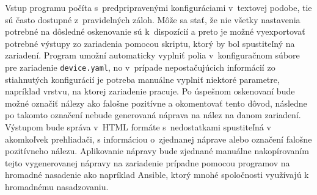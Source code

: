 Vstup programu počíta s~predpripravenými konfiguráciami v~textovej podobe, tie sú často dostupné z~pravidelných záloh. Môže sa stať, že nie všetky nastavenia potrebné na dôsledné oskenovanie sú k~dispozícií a preto je možné vyexportovať potrebné výstupy zo zariadenia pomocou skriptu, ktorý by bol spustiteľný na zariadení. Program umožní automaticky vyplniť polia v~konfiguračnom súbore pre zariadenie \texttt{device.yaml}, no v~prípade nepostačujúcich informácií zo stiahnutých konfigurácií je potreba manuálne vyplniť niektoré parametre, napríklad vrstvu, na ktorej zariadenie pracuje. Po úspešnom oskenovaní bude možné označiť nálezy ako falošne pozitívne a okomentovať tento dôvod, následne po takomto označení nebude generovaná náprava na nález na danom zariadení. Výstupom bude správa v~HTML formáte s~nedostatkami spustiteľná v akomkoľvek prehliadači, s informáciou o~zjednanej náprave alebo označení falošne pozitívneho nálezu. Aplikovanie nápravy bude zjednané manuálne nakopírovaním tejto vygenerovanej nápravy na zariadenie prípadne pomocou programov na hromadné nasadenie ako napríklad Ansible, ktorý mnohé spoločnosti využívajú k hromadnému nasadzovaniu. 


